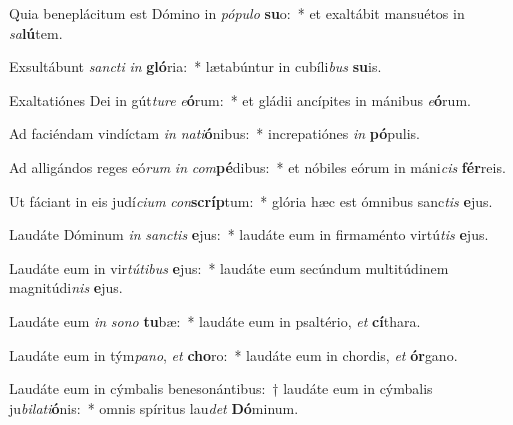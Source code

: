 \item Quia beneplácitum est Dómino in \textit{pó}\textit{pu}\textit{lo} \textbf{su}o:~* et exaltábit mansuétos in \textit{sa}\textbf{lú}tem.
\item Exsultábunt \textit{sanc}\textit{ti} \textit{in} \textbf{gló}ria:~* lætabúntur in cubíli\textit{bus} \textbf{su}is.
\item Exaltatiónes Dei in gút\textit{tu}\textit{re} \textit{e}\textbf{ó}rum:~* et gládii ancípites in mánibus \textit{e}\textbf{ó}rum.
\item Ad faciéndam vindíctam \textit{in} \textit{na}\textit{ti}\textbf{ó}nibus:~* increpatiónes \textit{in} \textbf{pó}pulis.
\item Ad alligándos reges eó\textit{rum} \textit{in} \textit{com}\textbf{pé}dibus:~* et nóbiles eórum in máni\textit{cis} \textbf{fér}reis.
\item Ut fáciant in eis judí\textit{ci}\textit{um} \textit{con}\textbf{scríp}tum:~* glória hæc est ómnibus sanc\textit{tis} \textbf{e}jus.
\item Laudáte Dóminum \textit{in} \textit{sanc}\textit{tis} \textbf{e}jus:~* laudáte eum in firmaménto virtú\textit{tis} \textbf{e}jus.
\item Laudáte eum in vir\textit{tú}\textit{ti}\textit{bus} \textbf{e}jus:~* laudáte eum secúndum multitúdinem magnitúdi\textit{nis} \textbf{e}jus.
\item Laudáte eum \textit{in} \textit{so}\textit{no} \textbf{tu}bæ:~* laudáte eum in psaltério, \textit{et} \textbf{cí}thara.
\item Laudáte eum in tým\textit{pa}\textit{no}, \textit{et} \textbf{cho}ro:~* laudáte eum in chordis, \textit{et} \textbf{ór}gano.
\item Laudáte eum in cýmbalis benesonántibus:~† laudáte eum in cýmbalis ju\textit{bi}\textit{la}\textit{ti}\textbf{ó}nis:~* omnis spíritus lau\textit{det} \textbf{Dó}minum.
